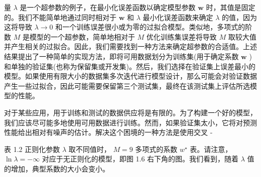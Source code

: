 \documentclass[10pt]{article}
\begin{document}
量 \(\lambda\) 是一个超参数的例子，在最小化误差函数以确定模型参数 \(\mathbf{w}\) 时，其值是固定的。我们不能简单地通过同时相对于 \(\mathbf{w}\) 和 \(\lambda\) 最小化误差函数来确定 \(\lambda\) 的值，因为这将导致 \(\lambda  \rightarrow  0\) 和一个训练误差很小或为零的过拟合模型。类似地，多项式的阶数 \(M\) 是模型的一个超参数，简单地相对于 \(M\) 优化训练集误差将导致 \(M\) 取较大值并产生相关的过拟合。因此，我们需要找到一种方法来确定超参数的合适值。上述结果提出了一种简单的实现方法，即将可用数据划分为训练集(用于确定系数 \(\mathbf{w}\) )和单独的验证集(也称为保留集或开发集)。然后，我们选择在验证集上误差最小的模型。如果使用有限大小的数据集多次迭代进行模型设计，那么可能会对验证数据产生一些过拟合，因此可能需要保留第三个测试集，最终在该测试集上评估所选模型的性能。

对于某些应用，用于训练和测试的数据供应将是有限的。为了构建一个好的模型，我们应该尽可能多地使用可用数据进行训练。然而，如果验证集太小，它将对预测性能给出相对有噪声的估计。解决这个困境的一种方法是使用交叉 -

\begin{center}
\end{center}

表 1.2 正则化参数 \(\lambda\) 取不同值时， \(M = 9\) 多项式的系数 \({w}^{ \star  }\) 表。请注意， \(\ln \lambda  =  - \infty\) 对应于无正则化的模型，即图 1.6 右下角的图。我们看到，随着 \(\lambda\) 值的增加，典型系数的大小会变小。
\end{document}
